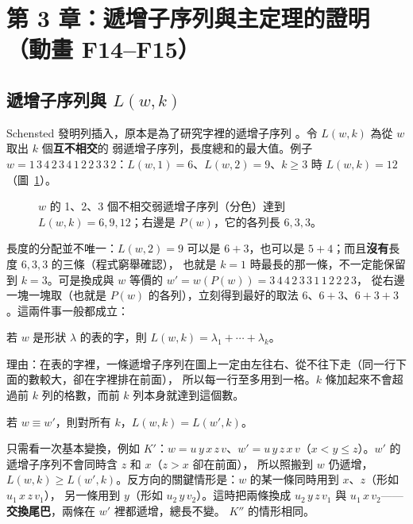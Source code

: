 
\section{第 3 章：遞增子序列與主定理的證明（動畫 F14--F15）}\label{sec:f-ch3}

\subsection{遞增子序列與 $L(w,k)$}\label{sec:f-increasing}

Schensted 發明列插入，原本是為了研究字裡的遞增子序列 。令 $L(w,k)$ 為從 $w$ 取出 $k$ 個\textbf{互不相交}的
弱遞增子序列，長度總和的最大值。例子 $w=1\,3\,4\,2\,3\,4\,1\,2\,2\,3\,3\,2$：$L(w,1)=6$、$L(w,2)=9$、$k\ge 3$ 時 $L(w,k)=12$（圖~\ref{fig:f-increasing}）。

\begin{figure}[H]
\centering
\FulIncreasing
\caption{$w$ 的 1、2、3 個不相交弱遞增子序列（分色）達到 $L(w,k)=6,9,12$；右邊是 $P(w)$，它的各列長 $6,3,3$。}
\label{fig:f-increasing}
\end{figure}

長度的分配並不唯一：$L(w,2)=9$ 可以是 $6+3$，也可以是 $5+4$；而且\textbf{沒有}長度 $6,3,3$ 的三條（程式窮舉確認），
也就是 $k=1$ 時最長的那一條，不一定能保留到 $k=3$。可是換成與 $w$ 等價的 $w'=w(P(w))=3\,4\,4\,2\,3\,3\,1\,1\,2\,2\,2\,3$，
從右邊一塊一塊取（也就是 $P(w)$ 的各列），立刻得到最好的取法 $6$、$6+3$、$6+3+3$。這兩件事一般都成立：

\begin{thmbox}
若 $w$ 是形狀 $\lambda$ 的表的字，則 $L(w,k)=\lambda_1+\cdots+\lambda_k$。
\end{thmbox}

理由：在表的字裡，一條遞增子序列在圖上一定由左往右、從不往下走（同一行下面的數較大，卻在字裡排在前面），
所以每一行至多用到一格。$k$ 條加起來不會超過前 $k$ 列的格數，而前 $k$ 列本身就達到這個數。

\begin{thmbox}
若 $w\equiv w'$，則對所有 $k$，$L(w,k)=L(w',k)$。
\end{thmbox}

只需看一次基本變換，例如 $K'$：$w=u\,y\,x\,z\,v$、$w'=u\,y\,z\,x\,v$（$x<y\le z$）。$w'$ 的遞增子序列不會同時含 $z$ 和 $x$（$z>x$ 卻在前面），
所以照搬到 $w$ 仍遞增，$L(w,k)\ge L(w',k)$。反方向的關鍵情形是：$w$ 的某一條同時用到 $x$、$z$（形如 $u_1\,x\,z\,v_1$），
另一條用到 $y$（形如 $u_2\,y\,v_2$）。這時把兩條換成 $u_2\,y\,z\,v_1$ 與 $u_1\,x\,v_2$——\textbf{交換尾巴}，兩條在 $w'$ 裡都遞增，總長不變。
$K''$ 的情形相同。


